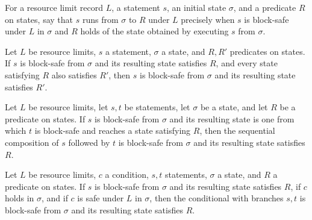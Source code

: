 \begin{definition}
\label{Light.Stmt.Runs}
\leanok
{}
For a resource limit record $L$, a statement $s$, an initial state $\sigma$, and a
predicate $R$ on states, say that $s$ runs from $\sigma$ to $R$ under $L$ precisely when
$s$ is block-safe under $L$ in $\sigma$ and $R$ holds of the state obtained by executing
$s$ from $\sigma$.
\end{definition}

\begin{theorem}
\label{Light.Stmt.Runs.mono}
\leanok
{}
Let $L$ be resource limits, $s$ a statement, $\sigma$ a state, and $R,R'$ predicates on
states. If $s$ is block-safe from $\sigma$ and its resulting state satisfies $R$, and
every state satisfying $R$ also satisfies $R'$, then $s$ is block-safe from $\sigma$ and
its resulting state satisfies $R'$.
\end{theorem}

\begin{theorem}
\label{Light.Stmt.Runs.seq}
\leanok
{}
Let $L$ be resource limits, let $s,t$ be statements, let $\sigma$ be a state, and let
$R$ be a predicate on states. If $s$ is block-safe from $\sigma$ and its resulting state
is one from which $t$ is block-safe and reaches a state satisfying $R$, then the
sequential composition of $s$ followed by $t$ is block-safe from $\sigma$ and its
resulting state satisfies $R$.
\end{theorem}

\begin{theorem}
\label{Light.Stmt.Runs.ite_pos}
\leanok
{}
Let $L$ be resource limits, $c$ a condition, $s,t$ statements, $\sigma$ a state, and $R$
a predicate on states. If $s$ is block-safe from $\sigma$ and its resulting state
satisfies $R$, if $c$ holds in $\sigma$, and if $c$ is safe under $L$ in $\sigma$, then
the conditional with branches $s,t$ is block-safe from $\sigma$ and its resulting state
satisfies $R$.
\end{theorem}

